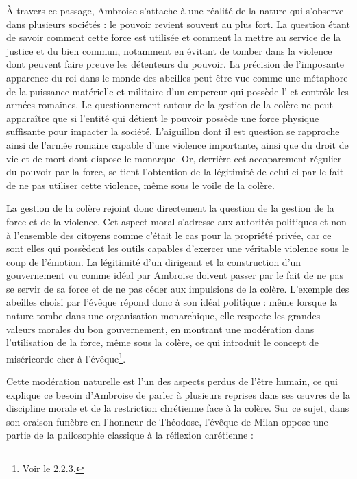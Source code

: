 \bigskip

À travers ce passage, Ambroise s'attache à une réalité de la nature qui s'observe dans plusieurs sociétés : le pouvoir revient souvent au plus fort. La question étant de savoir comment cette force est utilisée et comment la mettre au service de la justice et du bien commun, notamment en évitant de tomber dans la violence dont peuvent faire preuve les détenteurs du pouvoir. La précision de l'imposante apparence du roi dans le monde des abeilles peut être vue comme une métaphore de la puissance matérielle et militaire d'un empereur qui possède l' et contrôle les armées romaines. Le questionnement autour de la gestion de la colère ne peut apparaître que si l'entité qui détient le pouvoir possède une force physique suffisante pour impacter la société. L'aiguillon dont il est question se rapproche ainsi de l'armée romaine capable d'une violence importante, ainsi que du droit de vie et de mort dont dispose le monarque. Or, derrière cet accaparement régulier du pouvoir par la force, se tient l'obtention de la légitimité de celui-ci par le fait de ne pas utiliser cette violence, même sous le voile de la colère.

\bigskip

La gestion de la colère rejoint donc directement la question de la gestion de la force et de la violence. Cet aspect moral s'adresse aux autorités politiques et non à l'ensemble des citoyens comme c'était le cas pour la propriété privée, car ce sont elles qui possèdent les outils capables d'exercer une véritable violence sous le coup de l'émotion. La légitimité d'un dirigeant et la construction d'un gouvernement vu comme idéal par Ambroise doivent passer par le fait de ne pas se servir de sa force et de ne pas céder aux impulsions de la colère. L'exemple des abeilles choisi par l'évêque répond donc à son idéal politique : même lorsque la nature tombe dans une organisation monarchique, elle respecte les grandes valeurs morales du bon gouvernement, en montrant une modération dans l'utilisation de la force, même sous la colère, ce qui introduit le concept de miséricorde cher à l'évêque\footnote{Voir le 2.2.3.}.

\bigskip

Cette modération naturelle est l'un des aspects perdus de l'être humain, ce qui explique ce besoin d'Ambroise de parler à plusieurs reprises dans ses œuvres de la discipline morale et de la restriction chrétienne face à la colère. Sur ce sujet, dans son oraison funèbre en l'honneur de Théodose, l'évêque de Milan oppose une partie de la philosophie classique à la réflexion chrétienne :

